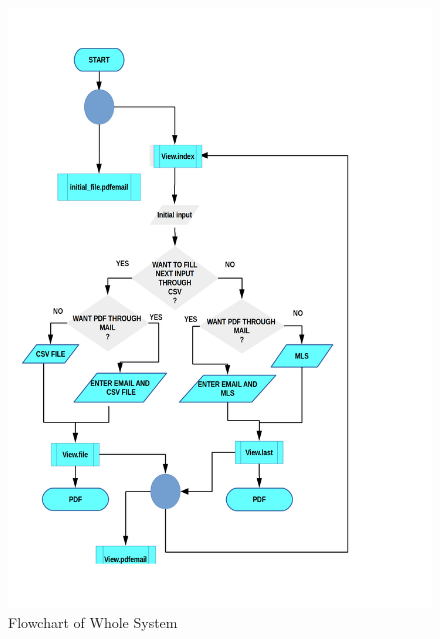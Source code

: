 \begin{figure}[H]
\centering \includegraphics[scale=0.27]{images/flowchart.png}
\caption{Flowchart of Whole System}
\label{fig:FD1}
\end{figure}


